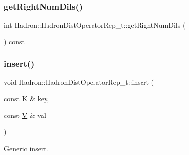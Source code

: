 \mbox{\label{classHadron_1_1HadronDistOperatorRep__t_ae7f1a0e6b68e409027be775990dd2970}} 
\subsubsection{\texorpdfstring{getRightNumDils()}{getRightNumDils()}\hspace{0.1cm}{\footnotesize\ttfamily [2/2]}}
{\footnotesize\ttfamily int Hadron\+::\+Hadron\+Dist\+Operator\+Rep\+\_\+t\+::get\+Right\+Num\+Dils (\begin{DoxyParamCaption}{ }\end{DoxyParamCaption}) const}

\mbox{\label{classHadron_1_1HadronDistOperatorRep__t_a05856fbd2f2205ddc461685d987713b9}} 
\subsubsection{\texorpdfstring{insert()}{insert()}\hspace{0.1cm}{\footnotesize\ttfamily [1/2]}}
{\footnotesize\ttfamily void Hadron\+::\+Hadron\+Dist\+Operator\+Rep\+\_\+t\+::insert (\begin{DoxyParamCaption}\item[{const \mbox{\hyperlink{classHadron_1_1HadronDistOperatorRep__t_a670c7409bfd80616aeb0159590bcdb6b}{K}} \&}]{key,  }\item[{const \mbox{\hyperlink{classHadron_1_1HadronDistOperatorRep__t_a40f37383ae57b1d0bbf944d698a10382}{V}} \&}]{val }\end{DoxyParamCaption})}



Generic insert. 

